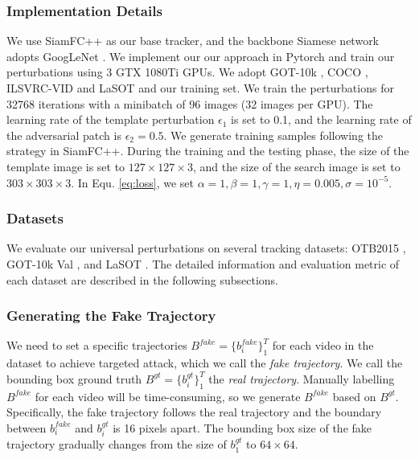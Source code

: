 \documentclass{article}
\begin{document}
\subsubsection{Implementation Details}

We use SiamFC++ \cite{SiamFC++} as our base tracker, and the backbone Siamese network adopts GoogLeNet \cite{GoogLeNet}.
We implement our our approach in Pytorch and train our perturbations using 3 GTX 1080Ti GPUs.
We adopt GOT-10k \cite{GOT-10k}, COCO \cite{COCO}, ILSVRC-VID \cite{VID} and LaSOT \cite{LaSOT} and our training set.
We train the perturbations for 32768 iterations with a minibatch of 96 images (32 images per GPU).
The learning rate of the template perturbation $\epsilon_1$ is set to 0.1, and the learning rate of the adversarial patch is $\epsilon_2 = 0.5$.
We generate training samples following the strategy in SiamFC++.
During the training and the testing phase, the size of the template image is set to $127\times 127\times 3$, and the size of the search image is set to $303\times 303\times 3$.
In Equ. \ref{eq:loss}, we set $\alpha=1, \beta=1, \gamma=1, \eta=0.005, \sigma=10^{-5}$.

\subsubsection{Datasets}
We evaluate our universal perturbations on several tracking datasets: OTB2015 \cite{OTB}, GOT-10k Val \cite{GOT-10k}, and LaSOT \cite{LaSOT}.
The detailed information and evaluation metric of each dataset are described in the following subsections.

\subsubsection{Generating the Fake Trajectory}

We need to set a specific trajectories $B^{fake}=\{b^{fake}_i\}_1^{T}$ for each video in the dataset to achieve targeted attack, which we call the \textit{fake trajectory}. We call the bounding box ground truth $B^{gt}=\{b^{gt}_i\}_1^T$ the \textit{real trajectory}.
Manually labelling $B^{fake}$ for each video will be time-consuming, so we generate $B^{fake}$ based on $B^{gt}$.
Specifically, the fake trajectory follows the real trajectory and the boundary between $b^{fake}_i$ and $b^{gt}_i$ is 16 pixels apart.
The bounding box size of the fake trajectory gradually changes from the size of $b^{gt}_1$ to $64\times 64$.
\end{document}
